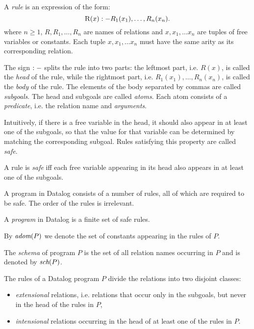 \begin{defn}[Rule]\label{d:datalogrule}
A \emph{rule} is an expression of the form:
$$ \textsc{R}(x) :- R_1(x_1), \dots, R_n(x_n). $$
where $n \ge 1$, $R, R_1, \dots, R_n$ are names of relations and $x, x_1, \dots x_n$ are tuples of free variables or constants. Each tuple $x, x_1, \dots x_n$ must have the same arity as its corresponding relation.
\end{defn}

The sign $:-$ splits the rule into two parts: the leftmost part, i.e. $R(x)$, is called the \emph{head} of the rule, while the rightmost part, i.e. $R_1(x_1), \dots, R_n(x_n)$, is called the \emph{body} of the rule. The elements of the body separated by commas are called \emph{subgoals}. The head and subgoals are called \emph{atoms}. Each atom consists of a \emph{predicate}, i.e. the relation name and \emph{arguments}.

Intuitively, if there is a free variable in the head, it should also appear in at least one of the subgoals, so that the value for that variable can be determined by matching the corresponding subgoal. Rules satisfying this property are called \emph{safe}.

\begin{defn}\label{d:datalogsaferule}
A rule is \emph{safe} iff each free variable appearing in its head also appears in at least one of the subgoals.
\end{defn}

A program in Datalog consists of a number of rules, all of which are required to be safe. The order of the rules is irrelevant.

\begin{defn}\label{d:datalogprog}
A \emph{program} in Datalog is a finite set of safe rules.
\end{defn}

By $\textit{adom}(P)$ we denote the set of constants appearing in the rules of $P$.

The \emph{schema} of program $P$ is the set of all relation names occurring in $P$ and is denoted by $\textit{sch}(P)$.

\begin{defn}
The rules of a Datalog program $P$ divide the relations into two disjoint classes: 
\begin{itemize}
\item \emph{extensional} relations, i.e. relations that occur only in the subgoals, but never in the head of the rules in $P$,
\item \emph{intensional} relations occurring in the head of at least one of the rules in $P$.
\end{itemize}
\end{defn}

